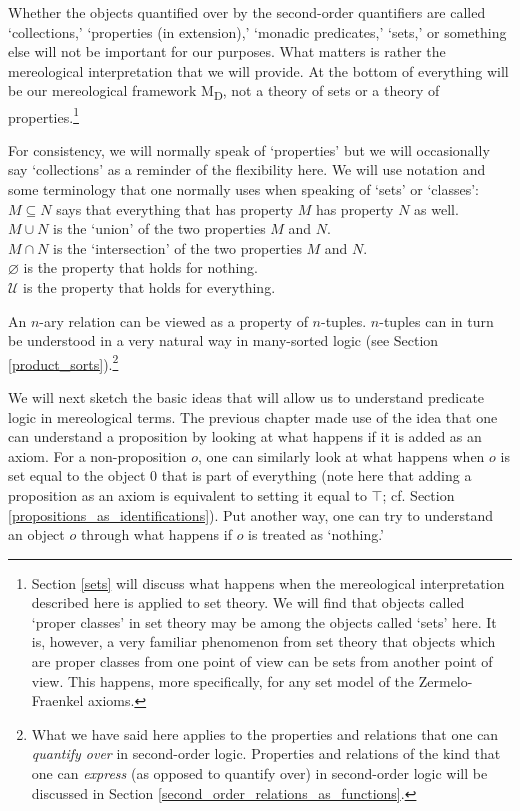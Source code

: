 \documentclass[12pt]{book}
\begin{document}
Whether the objects quantified over by the second-order quantifiers are called `collections,' `properties (in extension),' `monadic predicates,' `sets,' or something else will not be important for our purposes. What matters is rather the mereological interpretation that we will provide. At the bottom of everything will be our mereological framework M\textsubscript{D}, not a theory of sets or a theory of properties.\footnote{Section \ref{sets} will discuss what happens when the mereological interpretation described here is applied to set theory. We will find that objects called `proper classes' in set theory may be among the objects called `sets' here. It is, however, a very familiar phenomenon from set theory that objects which are proper classes from one point of view can be sets from another point of view. This happens, more specifically, for any set model of the Zermelo-Fraenkel axioms.}

For consistency, we will normally speak of `properties' but we will occasionally say `collections' as a reminder of the flexibility here. We will use notation and some terminology that one normally uses when speaking of `sets' or `classes':\\
\indent* $M \subseteq N$ says that everything that has property $M$ has property $N$ as well.\\
\indent* $M \cup N$ is the `union' of the two properties $M$ and $N$.\\
\indent* $M \cap N$ is the `intersection' of the two properties $M$ and $N$.\\
\indent* $\varnothing$ is the property that holds for nothing.\\
\indent* $\mathcal{U}$ is the property that holds for everything.

An $n$-ary relation can be viewed as a property of $n$-tuples. $n$-tuples can in turn be understood in a very natural way in many-sorted logic (see Section \ref{product_sorts}).\footnote{What we have said here applies to the properties and relations that one can \textit{quantify over} in second-order logic. Properties and relations of the kind that one can \textit{express} (as opposed to quantify over) in second-order logic will be discussed in Section \ref{second_order_relations_as_functions}.}

We will next sketch the basic ideas that will allow us to understand predicate logic in mereological terms. The previous chapter made use of the idea that one can understand a proposition by looking at what happens if it is added as an axiom. For a non-proposition $o$, one can similarly look at what happens when $o$ is set equal to the object 0 that is part of everything (note here that adding a proposition as an axiom is equivalent to setting it equal to $\top$; cf. Section \ref{propositions_as_identifications}). Put another way, one can try to understand an object $o$ through what happens if $o$ is treated as ‘nothing.’
\end{document}
